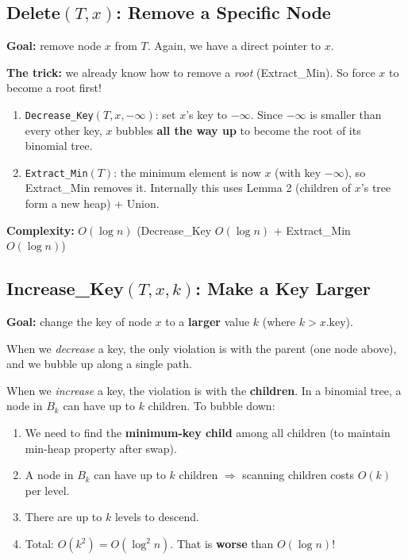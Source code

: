 \documentclass[11pt]{article}
\begin{document}
\subsection{Delete$(T, x)$: Remove a Specific Node}

\textcolor{heapblue}{\textbf{Goal:}} remove node $x$ from $T$. Again, we have a direct pointer to $x$.

\textbf{The trick:} we already know how to remove a \textit{root} (Extract\_Min). So force $x$ to become a root first!

\begin{defbox}[Delete$(T, x)$]
\begin{enumerate}[leftmargin=1.4em,itemsep=3pt]
    \item \texttt{Decrease\_Key$(T, x, -\infty)$}: set $x$'s key to $-\infty$. Since $-\infty$ is smaller than every other key, $x$ bubbles \textbf{all the way up} to become the root of its binomial tree.
    \item \texttt{Extract\_Min$(T)$}: the minimum element is now $x$ (with key $-\infty$), so Extract\_Min removes it. Internally this uses Lemma 2 (children of $x$'s tree form a new heap) + Union.
\end{enumerate}
\end{defbox}

\textbf{Complexity:} \textcolor{greenO}{$O(\log n)$} \quad (Decrease\_Key $O(\log n)$ + Extract\_Min $O(\log n)$)

\subsection{Increase\_Key$(T, x, k)$: Make a Key Larger}

\textcolor{heapblue}{\textbf{Goal:}} change the key of node $x$ to a \textbf{larger} value $k$ (where $k > x.\text{key}$).

\begin{warnbox}
When we \textit{decrease} a key, the only violation is with the parent (one node above), and we bubble up along a single path.

When we \textit{increase} a key, the violation is with the \textbf{children}. In a binomial tree, a node in $B_k$ can have up to $k$ children. To bubble down:
\begin{enumerate}[leftmargin=1.4em,itemsep=1pt]
    \item We need to find the \textbf{minimum-key child} among all children (to maintain min-heap property after swap).
    \item A node in $B_k$ can have up to $k$ children $\Rightarrow$ scanning children costs $O(k)$ per level.
    \item There are up to $k$ levels to descend.
    \item Total: $O(k^2) = O(\log^2 n)$. That is \textbf{worse} than $O(\log n)$!
\end{enumerate}
\end{warnbox}
\end{document}
